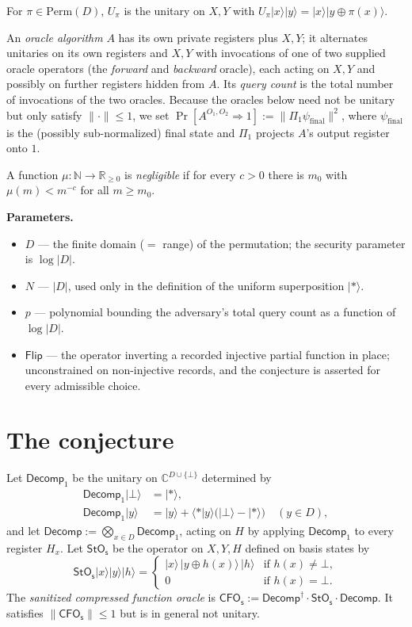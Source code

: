 \documentclass{aicr-conjecture}
\newcommand{\ket}[1]{|#1\rangle}
\newcommand{\braket}[2]{\langle #1 | #2 \rangle}
\newcommand{\unif}{\ket{{*}}}
\newcommand{\Perm}{\mathrm{Perm}}
\newcommand{\CC}{\mathbb{C}}
\newcommand{\NN}{\mathbb{N}}
\newcommand{\RR}{\mathbb{R}}
\newcommand{\Decomp}{\mathsf{Decomp}}
\newcommand{\Decompone}{\mathsf{Decomp}_1}
\newcommand{\StOs}{\mathsf{StO_s}}
\newcommand{\CFOs}{\mathsf{CFO_s}}
\newcommand{\Flip}{\mathsf{Flip}}
\begin{document}
For $\pi \in \Perm(D)$, $U_\pi$ is the unitary on $X, Y$ with
$U_\pi \ket{x}\ket{y} = \ket{x} \ket{y \oplus \pi(x)}$.

An \emph{oracle algorithm} $A$ has its own private registers plus
$X, Y$; it alternates unitaries on its own registers and $X,Y$ with
invocations of one of two supplied oracle operators (the \emph{forward}
and \emph{backward} oracle), each acting on $X, Y$ and possibly on
further registers hidden from $A$. Its \emph{query count} is the total
number of invocations of the two oracles. Because the oracles below
need not be unitary but only satisfy $\|\cdot\| \le 1$, we set
$\Pr[A^{O_1,O_2} \Rightarrow 1] := \|\Pi_1 \psi_{\mathrm{final}}\|^2$,
where $\psi_{\mathrm{final}}$ is the (possibly sub-normalized) final
state and $\Pi_1$ projects $A$'s output register onto $1$.

A function $\mu : \NN \to \RR_{\ge 0}$ is \emph{negligible} if for
every $c > 0$ there is $m_0$ with $\mu(m) < m^{-c}$ for all
$m \ge m_0$.

\textbf{Parameters.}
\begin{itemize}[leftmargin=1.2em]
\item $D$ --- the finite domain ($=$ range) of the permutation; the
  security parameter is $\log|D|$.
\item $N$ --- $|D|$, used only in the definition of the uniform
  superposition $\unif$.
\item $p$ --- polynomial bounding the adversary's total query count as
  a function of $\log|D|$.
\item $\Flip$ --- the operator inverting a recorded injective partial
  function in place; unconstrained on non-injective records, and the
  conjecture is asserted for every admissible choice.
\end{itemize}

\section{The conjecture}\label{sec:conjectures}

\begin{definition}
\label{def:cfos}
Let $\Decompone$ be the unitary on $\CC^{D \cup \{\bot\}}$ determined
by
\begin{align*}
  \Decompone \ket{\bot} &= \unif, \\
  \Decompone \ket{y} &= \ket{y} + \braket{{*}}{y}
    \bigl( \ket{\bot} - \unif \bigr) \quad (y \in D),
\end{align*}
and let $\Decomp := \bigotimes_{x \in D} \Decompone$, acting on $H$ by
applying $\Decompone$ to every register $H_x$. Let $\StOs$ be the
operator on $X, Y, H$ defined on basis states by
\[
  \StOs \ket{x} \ket{y} \ket{h} =
  \begin{cases}
    \ket{x}\, \ket{y \oplus h(x)}\, \ket{h}
      & \text{if } h(x) \neq \bot, \\
    0 & \text{if } h(x) = \bot.
  \end{cases}
\]
The \emph{sanitized compressed function oracle} is
$\CFOs := \Decomp^\dagger \cdot \StOs \cdot \Decomp$. It satisfies
$\|\CFOs\| \le 1$ but is in general not unitary.
\end{definition}
\end{document}
